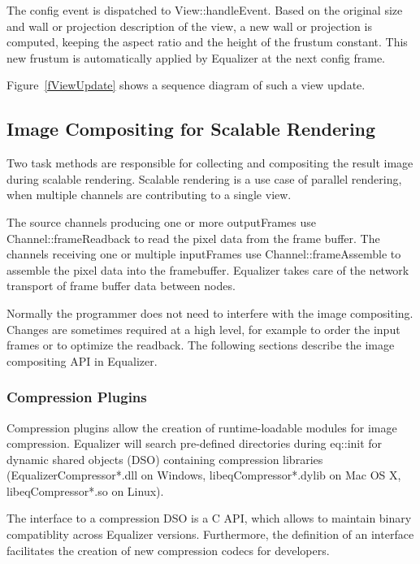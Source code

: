 \documentclass[10pt,a4]{scrartcl}
\newcommand{\fig}[1]{Figure~\ref{#1}}
\begin{document}
The config event is dispatched to \textsf{View::handleEvent}. Based on
the original size and wall or projection description of the view, a new
wall or projection is computed, keeping the aspect ratio and the height
of the frustum constant. This new frustum is automatically applied by
Equalizer at the next config frame.

\fig{fViewUpdate} shows a sequence diagram of such a view update.


\subsection{\label{sCompositing}Image Compositing for Scalable Rendering}

Two task methods are responsible for collecting and compositing the
result image during scalable rendering. Scalable rendering is a use case
of parallel rendering, when multiple channels are contributing to a single
view. 

The source channels producing one or more \textsf{outputFrame}s use
\textsf{Channel::frame\-Read\-back} to read the pixel data from the frame
buffer. The channels receiving one or multiple \textsf{inputFrame}s use
\textsf{Channel::frameAssemb\-le} to assemble the pixel data into the
framebuffer. Equalizer takes care of the network transport of frame
buffer data between nodes.

Normally the programmer does not need to interfere with the image
compositing. Changes are sometimes required at a high level, for example
to order the input frames or to optimize the readback. The following
sections describe the image compositing API in Equalizer.

\subsubsection{Compression Plugins}

Compression plugins allow the creation of runtime-loadable modules for
image compression. Equalizer will search pre-defined directories during
\textsf{eq::init} for dynamic shared objects (DSO) containing compression
libraries (EqualizerCompressor*.dll on Windows, libeqCompressor*.dylib
on Mac OS X, libeqCompressor*.so on Linux).

The interface to a compression DSO is a C API, which allows to maintain
binary compatiblity across Equalizer versions. Furthermore, the
definition of an interface facilitates the creation of new compression
codecs for developers. 
\end{document}
